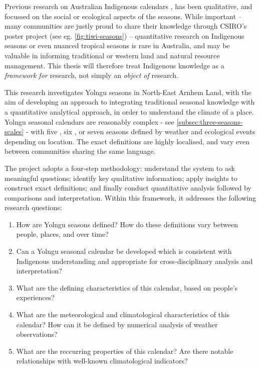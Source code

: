 
Previous research on Australian Indigenous calendars ,
\citep{CSIROcals,clarke2009,davis1989,atlas2014}
has been qualitative, and focussed on the social or ecological aspects of
the seasons.  While important -- many communities are justly proud to share
their knowledge through CSIRO's poster project (see eg. \cref{fig:tiwi-seasons})
-- quantitative research on Indigenous seasons or even nuanced tropical seasons
is rare in Australia, and may be valuable in informing traditional or western
land and natural resource management.  This thesis will therefore treat
Indigenous knowledge as a \emph{framework for} research, not simply an
\emph{object of} research.


This research investigates Yolngu seasons in North-East Arnhem Land, with the
aim of developing an approach to integrating traditional seasonal knowledge
with a quantitative analytical approach, in order to understand the climate
of a place.  Yolngu seasonal calendars are reasonably complex - see
\cref{subsec:three-seasons-scales} - with five \citep{davis1989}, six
\citep{atlas2014}, or seven \citep{barber2005} seasons defined by weather and
ecological events depending on location.  The exact definitions are highly localised,
and vary even between communities sharing the same language.

The project adopts a four-step methodology:  understand the system to ask
meaningful questions; identify key qualitative information; apply insights to
construct exact definitions; and finally conduct quantitative analysis
followed by comparisons and interpretation.  Within this framework, it
addresses the following research questions:
\begin{enumerate}
\item How are Yolngu seasons defined?  How do these definitions vary between
    people, places, and over time?
\item Can a Yolngu seasonal calendar be developed which is consistent with Indigenous
    understanding and appropriate for cross-disciplinary analysis and interpretation?
\item What are the defining characteristics of this calendar, based on
    people's experiences?
\item What are the meteorological and climatological characteristics of this
    calendar?  How can it be defined by numerical analysis of weather observations?
\item What are the reccurring properties of this calendar?  Are there notable
    relationships with well-known climatological indicators?
\end{enumerate}

